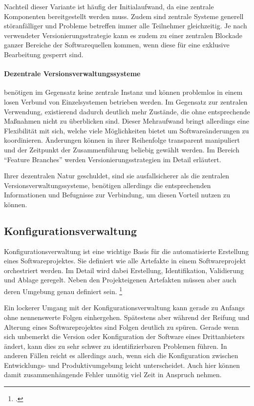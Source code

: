 Nachteil dieser Variante ist häufig der Initialaufwand, da eine zentrale Komponenten bereitgestellt werden muss. Zudem sind zentrale Systeme generell störanfälliger und Probleme betreffen immer alle Teilnehmer gleichzeitig.
Je nach verwendeter Versionierungsstrategie kann es zudem zu einer zentralen Blockade ganzer Bereiche der Softwarequellen kommen, wenn diese für eine exklusive Bearbeitung gesperrt sind.

\paragraph{Dezentrale Versionsverwaltungssysteme} benötigen im Gegensatz keine zentrale Instanz und können problemlos in einem losen Verbund von Einzelsystemen betrieben werden. 
Im Gegensatz zur zentralen Verwendung, existierend dadurch deutlich mehr Zustände, die ohne entsprechende Maßnahmen nicht zu überblicken sind. Dieser Mehraufwand bringt allerdings eine Flexibilität mit sich, welche viele Möglichkeiten bietet um Softwareänderungen zu koordinieren. Änderungen können in ihrer Reihenfolge transparent manipuliert und der Zeitpunkt der Zusammenführung beliebig gewählt werden. 
Im Bereich ``Feature Branches'' werden Versionierungsstrategien im Detail erläutert.

Ihrer dezentralen Natur geschuldet, sind sie ausfallsicherer als die zentralen Versionsverwaltungssysteme, benötigen allerdings die entsprechenden Informationen und Befugnisse zur Verbindung, um diesen Vorteil nutzen zu können.

\subsection{Konfigurationsverwaltung}

Konfigurationsverwaltung ist eine wichtige Basis für die automatisierte Erstellung eines Softwareprojektes. Sie definiert wie alle Artefakte in einem Softwareprojekt orchestriert werden. Im Detail wird dabei Erstellung, Identifikation, Validierung und Ablage geregelt. Neben den Projekteigenen Artefakten müssen aber auch deren Umgebung genau definiert sein. \footcite{humble2010}

Ein lockerer Umgang mit der Konfigurationsverwaltung kann gerade zu Anfangs ohne nennenswerte Folgen einhergehen. Spätestens aber während der Reifung und Alterung eines Softwareprojektes sind Folgen deutlich zu spüren. Gerade wenn sich unbemerkt die Version oder Konfiguration der Software eines Drittanbieters ändert, kann dies zu sehr schwer zu identifizierbaren Problemen führen. In anderen Fällen reicht es allerdings auch, wenn sich die Konfiguration zwischen Entwicklungs- und Produktivumgebung leicht unterscheidet. Auch hier können damit zusammenhängende Fehler unnötig viel Zeit in Anspruch nehmen.

